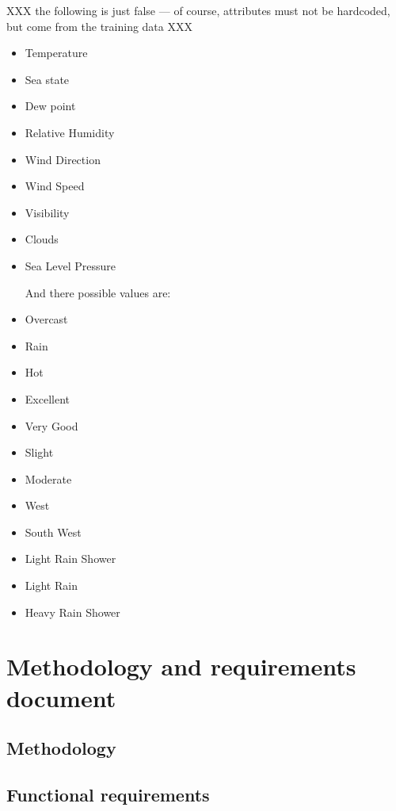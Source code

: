 \documentclass{article}
\begin{document}
XXX the following is just false --- of course, attributes must not be
hardcoded, but come from the training data XXX

\begin{itemize}
\item Temperature 
\item Sea state
\item Dew point
\item Relative Humidity
\item Wind Direction
\item Wind Speed
\item Visibility
\item Clouds 
\item Sea Level Pressure

And there possible values are: 

\item Overcast
\item Rain
\item Hot
\item Excellent
\item Very Good
\item Slight
\item Moderate
\item West
\item South West
\item Light Rain Shower
\item Light Rain
\item Heavy Rain Shower


\end{itemize}
\pagebreak

\section{Methodology and requirements document}
\label{sec:methrecdoc}

\subsection{Methodology}
\label{sec:meth}


\subsection{Functional requirements}
\end{document}
